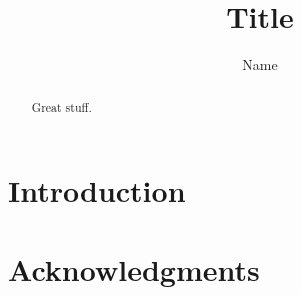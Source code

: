 \documentclass[a4paper,12pt,reqno]{amsart}
\title{Title}
\author{Name}
\numberwithin{equation}{section}
\theoremstyle{plain}
\theoremstyle{definition}
\theoremstyle{remark}
\begin{document}
\begin{abstract}
    Great stuff.
\end{abstract}

\maketitle

\setcounter{tocdepth}{1}
\tableofcontents

\section{Introduction}


\section*{Acknowledgments}



\end{document}
